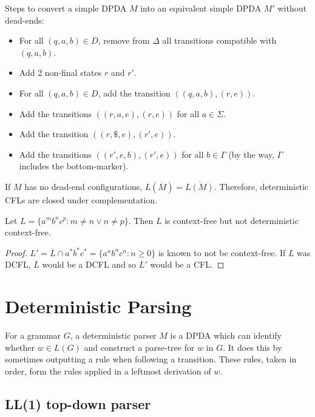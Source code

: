 Steps to convert a simple DPDA $M$ into an equivalent simple DPDA $M'$ without dead-ends:
\begin{itemize}
\item For all $(q, a, b) \in D$, remove from $\Delta$ all transitions compatible with $(q, a, b)$.
\item Add 2 non-final states $r$ and $r'$.
\item For all $(q, a, b) \in D$, add the transition $((q, a, b), (r, e))$.
\item Add the transitions $((r, a, e), (r, e))$ for all $a \in \Sigma$.
\item Add the transition $((r, \$, e), (r', e))$.
\item Add the transitions $((r', e, b), (r', e))$ for all $b \in \Gamma$
    (by the way, $\Gamma$ includes the bottom-marker).
\end{itemize}

If $M$ has no dead-end configurations, $L(\overline{M}) = \overline{L(M)}$.
Therefore, deterministic CFLs are closed under complementation.

\begin{theorem}
Let $L = \{a^mb^nc^p: m \neq n \vee n \neq p\}$. Then $L$ is context-free but not deterministic context-free.
\end{theorem}
\begin{proof}
$L' = \overline{L}\cap a^*b^*c^* = \{a^nb^nc^n: n \ge 0\}$ is known to not be context-free.
If $L$ was DCFL, $\overline{L}$ would be a DCFL and so $L'$ would be a CFL.
\end{proof}

\section{Deterministic Parsing}

\begin{definition}
For a grammar $G$, a deterministic parser $M$ is a DPDA which can
identify whether $w \in L(G)$ and construct a parse-tree for $w$ in $G$.
It does this by sometimes outputting a rule when following a transition.
These rules, taken in order, form the rules applied in a leftmost derivation of $w$.
\end{definition}

\subsection{LL(1) top-down parser}

